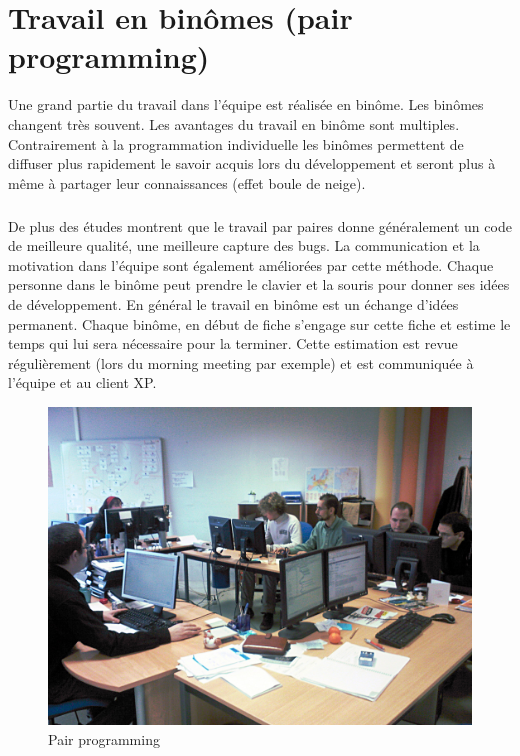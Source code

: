 \section{Travail en binômes (pair programming)}
Une grand partie du travail dans l'équipe est réalisée en binôme. Les binômes changent très souvent. Les avantages du travail en binôme sont multiples. Contrairement à la programmation individuelle les binômes permettent de diffuser plus rapidement le savoir acquis lors du développement et seront plus à même à partager leur connaissances (effet boule de neige).
\subparagraph*{}
De plus des études montrent que le travail par paires donne généralement un code de meilleure qualité, une meilleure capture des bugs. La communication et la motivation dans l'équipe sont également améliorées par cette méthode. Chaque personne dans le binôme peut prendre le clavier et la souris pour donner ses idées de développement. En général le travail en binôme est un échange d'idées permanent. Chaque binôme, en début de fiche s'engage sur cette fiche et estime le temps qui lui sera nécessaire pour la terminer. Cette estimation est revue régulièrement (lors du morning meeting par exemple) et est communiquée à l'équipe et au client XP.
\begin{figure}[!ht]
\centering
\includegraphics[scale=0.15]{Illustrations/SP_A0188.jpg}
\caption{Pair programming}
\label{fig:Pair programming}
\end{figure}

